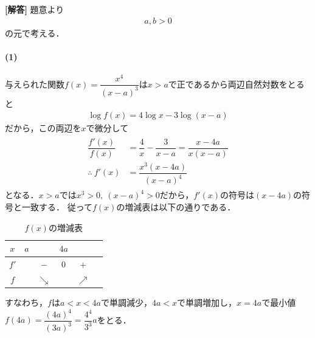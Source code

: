 \documentclass[../../main.tex]{subfiles}
\begin{document}
\begin{oframed}
  
\end{oframed}

{\bf [解答]}
題意より
\begin{align}
  a,b >0 \label{eq:1}
\end{align}
の元で考える．

\paragraph{(1)}

与えられた関数$f(x)=\dfrac{x^4}{(x-a)^3}$は$x>a$で正であるから両辺自然対数をとると
\begin{align}
  \log f(x)=4\log x-3\log(x-a)
\end{align}
だから，この両辺を$x$で微分して
\begin{align}
  \begin{split}
    \dfrac{f'(x)}{f(x)}&=\dfrac{4}{x}-\dfrac{3}{x-a}=\dfrac{x-4a}{x(x-a)} \\
    \therefore\ f'(x) &=\dfrac{x^3(x-4a)}{(x-a)^4}
  \end{split}
\end{align}
となる．$x>a$では$x^3>0,\ (x-a)^4>0$だから，$f'(x)$の符号は$(x-4a)$の符号と一致する．
従って$f(x)$の増減表は以下の通りである．

\begin{table}[htb]
  \centering
  \caption{$f(x)$の増減表}
  \begin{tabular}{c|ccccc}
    $x$ & $a$ & & $4a$ & & \\
    \hline
    $f'$ & & $-$ & $0$ & $+$ & \\
    \hline
    $f$ & & $\searrow$ & & $\nearrow$ &
  \end{tabular}
\end{table}

すなわち，$f$は$a<x<4a$で単調減少，$4a<x$で単調増加し，$x=4a$で最小値$f(4a)=\dfrac{(4a)^4}{(3a)^3}=\dfrac{4^4}{3^3}a$をとる．
\end{document}
